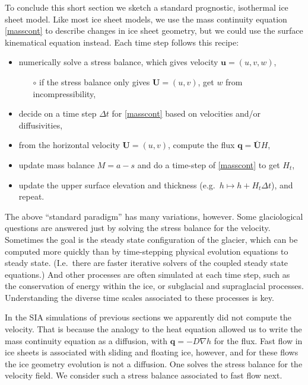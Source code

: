 \documentclass[letterpaper,final,12pt,reqno]{amsart}
\newcommand{\bq}{\mathbf{q}}
\newcommand{\bU}{\mathbf{U}}
\begin{document}
To conclude this short section we sketch a standard prognostic, isothermal ice sheet model.  Like most ice sheet models, we use the mass continuity equation \eqref{masscont} to describe changes in ice sheet geometry, but we could use the surface kinematical equation instead.  Each time step follows this recipe:
  \begin{itemize}
  \item numerically solve a stress balance, which gives velocity $\mathbf{u}=(u,v,w)$,
    \begin{itemize}
    \item[$\circ$] if the stress balance only gives $\mathbf{U}=(u,v)$, get $w$ from incompressibility,
    \end{itemize}
  \item decide on a time step $\Delta t$ for \eqref{masscont} based on velocities and/or diffusivities,
  \item from the horizontal velocity $\mathbf{U}=(u,v)$, compute the flux $\bq = \bar{\bU} H$,
  \item update mass balance $M=a-s$ and do a time-step of \eqref{masscont} to get $H_t$,
  \item update the upper surface elevation and thickness (e.g.~$h \mapsto h + H_t \Delta t$), and repeat.
  \end{itemize}

The above ``standard paradigm'' has many variations, however.  Some glaciological questions are answered just by solving the stress balance for the velocity.  Sometimes the goal is the steady state configuration of the glacier, which can be computed more quickly than by time-stepping physical evolution equations to steady state.  (I.e.~there are faster iterative solvers of the coupled steady state equations.)  And other processes are often simulated at each time step, such as the conservation of energy within the ice, or subglacial and supraglacial processes.  Understanding the diverse time scales associated to these processes is key.

In the SIA simulations of previous sections we apparently did not compute the velocity.  That is because the analogy to the heat equation allowed us to write the mass continuity equation as a diffusion, with $\bq=-D\nabla h$ for the flux.  Fast flow in ice sheets is associated with sliding and floating ice, however, and for these flows the ice geometry evolution is not a diffusion.  One solves the stress balance for the velocity field.  We consider such a stress balance associated to fast flow next.
\end{document}
